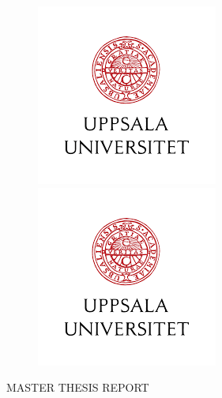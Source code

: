 \documentclass[a4]{report}
\begin{document}
    \begin{titlepage}

        \begin{figure}
            \begin{minipage}{0.48\textwidth}
                \begin{flushleft}
                    \includegraphics[scale=0.5]{images/UU_LOGO.png}
                \end{flushleft}
            \end{minipage}\hfill
            \begin{minipage}{0.48\textwidth}
                \begin{flushright}
                    \includegraphics[scale=0.5]{images/UU_LOGO.png}
                \end{flushright}
            \end{minipage}
        \end{figure}

        \thispagestyle{fancy}

        \vspace{1in}

        \center

        \textsc{\large MASTER THESIS REPORT}

        \vspace{0.5in}


\end{titlepage}
\end{document}
